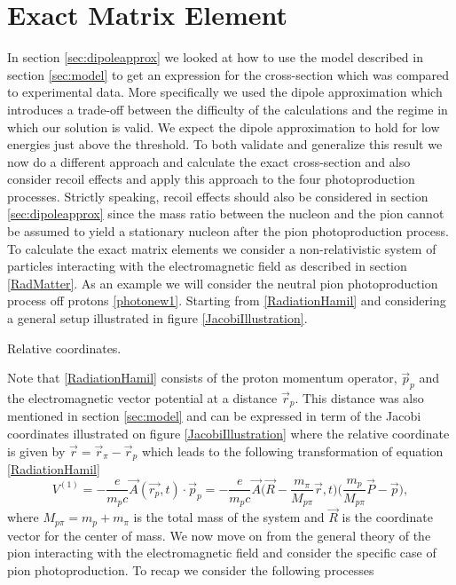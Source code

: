 \section{Exact Matrix Element}\label{sec:exact}
In section \ref{sec:dipoleapprox} we looked at how to use the model described in section \ref{sec:model} to get an expression for the cross-section which was compared to experimental data. More specifically we used the dipole approximation which introduces a trade-off between the difficulty of the calculations and the regime in which our solution is valid. We expect the dipole approximation to hold for low energies just above the threshold. To both validate and generalize this result we now do a different approach and calculate the exact cross-section and also consider recoil effects and apply this approach to the four photoproduction processes. Strictly speaking, recoil effects should also be considered in section \ref{sec:dipoleapprox} since the mass ratio between the nucleon and the pion cannot be assumed to yield a stationary nucleon after the pion photoproduction process.  
To calculate the exact matrix elements we consider a non-relativistic system of particles interacting with the electromagnetic field as described in section \ref{RadMatter}. As an example we will consider the neutral pion photoproduction process off protons \eqref{photonew1}. Starting from \eqref{RadiationHamil} and considering a general setup illustrated in figure \ref{JacobiIllustration}. 
\begin{marginfigure}
	\centering
	
	\caption{Relative coordinates.}
	\label{JacobiIllustration}
\end{marginfigure}
Note that \eqref{RadiationHamil} consists of the proton momentum operator, $\vec{p}_p$ and the electromagnetic vector potential at a distance $\vec{r}_p$. This distance was also mentioned in section \ref{sec:model} and can be expressed in term of the Jacobi coordinates illustrated on figure \ref{JacobiIllustration} where the relative coordinate is given by $\vec{r}=\vec{r}_\pi-\vec{r}_p$ which leads to the following transformation of equation \eqref{RadiationHamil}
\begin{equation}
	V^{(1)} = -\frac{e}{m_p c}\vec{A}(\vec{r_p},t)\cdot \vec{p}_p = -\frac{e}{m_p c} \vec{A}\bigg( \vec{R}-\frac{m_\pi}{M_{p\pi}}\vec{r},t\bigg)\bigg(\frac{m_p}{M_{p\pi}}\vec{P}-\vec{p}\bigg),
\end{equation}
where $M_{p \pi}=m_p+m_\pi$ is the total mass of the system and $\vec{R}$ is the coordinate vector for the center of mass. We now move on from the general theory of the pion interacting with the electromagnetic field and consider the specific case of pion photoproduction. To recap we consider the following processes
